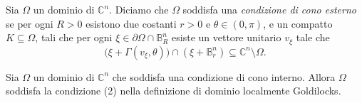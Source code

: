 \begin{defn}
    Sia $\Omega$ un dominio di $\mathbb{C}^n$. Diciamo che $\Omega$ soddisfa una \textit{condizione di cono esterno} se per ogni $R>0$ esistono due costanti $r>0$ e $\theta\in(0,\pi)$, e un compatto $K\subseteq\Omega$, tali che per ogni $\xi\in\partial\Omega\cap\mathbb{B}^n_R$ esiste un vettore unitario $v_\xi$ tale che
    $$\big(\xi+\Gamma(v_\xi,\theta)\big)\cap (\xi+\mathbb{B}^n_r)\subseteq\mathbb{C}^n\setminus\Omega.$$
\end{defn}

\begin{lm} \label{conin}
    Sia $\Omega$ un dominio di $\mathbb{C}^n$ che soddisfa una condizione di cono interno. Allora $\Omega$ soddisfa la condizione (2) nella definizione di dominio localmente Goldilocks.
\end{lm}

